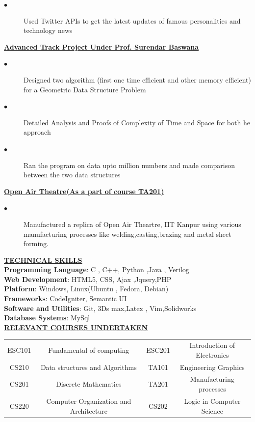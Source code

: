 \documentclass[10pt]{article}
\begin{document}
\begin{flushleft}
\begin{description}
\item[$\bullet$]Used Twitter APIs to get the latest updates of famous personalities and technology news\\
\end{description}
\textbf{\underline{Advanced Track Project Under Prof. Surendar Baswana}}
\begin{description}
\item[$\bullet$]Designed two algorithm (first one time efficient and other memory efficient) for a Geometric Data Structure Problem
\item[$\bullet$]Detailed Analysis and Proofs of Complexity of Time and Space for both he approach
\item[$\bullet$]Ran the program on data upto million numbers and made comparison between the two data structures\\
\end{description}
\textbf{\underline{Open Air Theatre(As a part of course TA201)	}}
\begin{description}
\item[$\bullet$]Manufactured a replica of Open Air Theartre, IIT Kanpur using various manufacturing processes like welding,casting,brazing and metal sheet forming.
\end{description}
{\large \textbf{\underline{TECHNICAL SKILLS}}}\\
\textbf{Programming Language}: C , C++, Python ,Java , Verilog\\
\textbf{Web Development}: HTML5, CSS, Ajax ,Jquery,PHP\\
\textbf{Platform}: Windows, Linux(Ubuntu , Fedora, Debian)\\
\textbf{Frameworks}: CodeIgniter, Semantic UI\\
\textbf{Software and Utilities}: Git, 3Ds max,Latex , Vim,Solidworks\\
\textbf{Database Systems}: MySql\\
{\large \textbf{\underline{RELEVANT COURSES UNDERTAKEN}}}\\
\begin{tabular}{c c c c}
\hline \hline
ESC101 & Fundamental of computing & ESC201 & Introduction of Electronics\\
CS210 & Data structures and Algorithms & TA101 & Engineering Graphics\\
CS201 & Discrete Mathematics & TA201 & Manufacturing processes\\
CS220 & Computer Organization and Architecture & CS202 & Logic in Computer Science \\

\end{tabular}
\end{flushleft}
\end{document}
